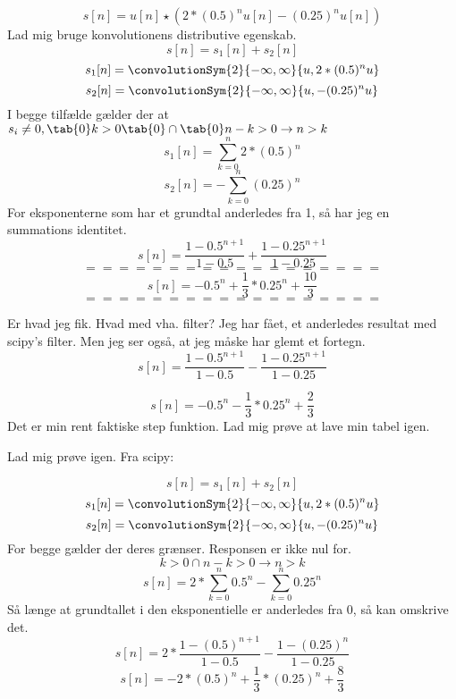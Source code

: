 \begin{Opgaver}
\begin{kapitel}[Z transformation]
\begin{Opgave}
            \begin{UnderOpgave}
                \[s[n] = u[n] \star (2*(0.5)^nu[n] - (0.25)^nu[n])\]
                Lad mig bruge konvolutionens distributive egenskab. 
                 \[s[n] = s_1[n] + s_2[n]\]
                 \[s_1[n] = \convolutionSym{2}{-\infty, \infty}{u, 2*(0.5)^nu}\]
                 \[s_2[n] = \convolutionSym{2}{-\infty, \infty}{u, -(0.25)^nu}\]
                 I begge tilfælde gælder der at $s_i \neq 0, \tab{0} k > 0 \tab{0} \cap \tab{0} n - k > 0 \rightarrow n > k $ 
                 \[s_1[n] = \sum_{k = 0}^{n}{2*(0.5)^n}\]
                 \[s_2[n] = -\sum_{k = 0}^{n}{(0.25)^n}\]
                 For eksponenterne som har et grundtal anderledes fra 1, så har jeg en summations identitet. 
                 \[s[n] = \frac{1 - 0.5^{n + 1}}{1 - 0.5} + \frac{1 - 0.25^{n+1}}{1 - 0.25}\]
                 \[==================\]
                 \[s[n] = -0.5^n + \frac{1}{3} * 0.25^n + \frac{10}{3}\]
                 \[==================\]

            \end{UnderOpgave}
            \color{red}
            \begin{UnderOpgave}
                Er hvad jeg fik. Hvad med vha. filter? 
                Jeg har fået, et anderledes resultat med scipy's filter. Men jeg ser også, at jeg måske har glemt et fortegn. 
                \[s[n] = \frac{1 - 0.5^{n + 1}}{1 - 0.5} - \frac{1 - 0.25^{n+1}}{1 - 0.25}\]
                
                \[s[n] = -0.5^n - \frac{1}{3} * 0.25^n + \frac{2}{3}\]
                Det er min rent faktiske step funktion. Lad mig prøve at lave min tabel igen. 
            \end{UnderOpgave}
            \color{black}
            Lad mig prøve igen.
            Fra scipy: 

            \[s[n] = s_1[n] + s_2[n]\]
            \[s_1[n] = \convolutionSym{2}{-\infty, \infty}{u, 2*(0.5)^nu}\]
            \[s_2[n] = \convolutionSym{2}{-\infty, \infty}{u, -(0.25)^nu}\]
            For begge gælder der deres grænser. Responsen er ikke nul for.
            \[k > 0 \cap n - k > 0 \rightarrow n > k \]
            \[s[n] = 2*\sum_{k = 0}^{n}{0.5^n} - \sum_{k = 0}^{n}{0.25^n}\]
            Så længe at grundtallet i den eksponentielle er anderledes fra 0, så kan omskrive det. 
            \[s[n] = 2 * \frac{1 - (0.5)^{n + 1}}{1 - 0.5} - \frac{1 - (0.25)^n}{1 - 0.25}\]
            \[s[n] = -2*(0.5)^n + \frac{1}{3} * (0.25)^n + \frac{8}{3}\]


\end{Opgave}
\end{kapitel}
\end{Opgaver}
